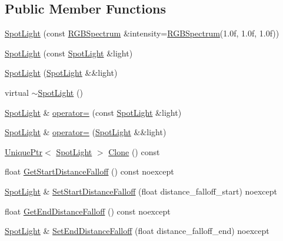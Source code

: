 \subsection*{Public Member Functions}
\begin{DoxyCompactItemize}
\item 
\hyperlink{classmage_1_1_spot_light_adc5c7b5fead1b7b0c8728ffd816a9ada}{Spot\+Light} (const \hyperlink{structmage_1_1_r_g_b_spectrum}{R\+G\+B\+Spectrum} \&intensity=\hyperlink{structmage_1_1_r_g_b_spectrum}{R\+G\+B\+Spectrum}(1.\+0f, 1.\+0f, 1.\+0f))
\item 
\hyperlink{classmage_1_1_spot_light_a597abd916ed14372be208a68eb01b871}{Spot\+Light} (const \hyperlink{classmage_1_1_spot_light}{Spot\+Light} \&light)
\item 
\hyperlink{classmage_1_1_spot_light_a3a5574f34f5b80cbeef00709f8a9d094}{Spot\+Light} (\hyperlink{classmage_1_1_spot_light}{Spot\+Light} \&\&light)
\item 
virtual \hyperlink{classmage_1_1_spot_light_aeeaba91c6448102ac6a23587c5366808}{$\sim$\+Spot\+Light} ()
\item 
\hyperlink{classmage_1_1_spot_light}{Spot\+Light} \& \hyperlink{classmage_1_1_spot_light_a04a23d643186a58fb3a03d0a73a63e39}{operator=} (const \hyperlink{classmage_1_1_spot_light}{Spot\+Light} \&light)
\item 
\hyperlink{classmage_1_1_spot_light}{Spot\+Light} \& \hyperlink{classmage_1_1_spot_light_ab79e4bf1c488c1a753f434a4d84567e5}{operator=} (\hyperlink{classmage_1_1_spot_light}{Spot\+Light} \&\&light)
\item 
\hyperlink{namespacemage_a8c307fbcc33bce9b7f2aa4c26c3b95cf}{Unique\+Ptr}$<$ \hyperlink{classmage_1_1_spot_light}{Spot\+Light} $>$ \hyperlink{classmage_1_1_spot_light_a1092a1238be8cfd771a43e6976d16270}{Clone} () const
\item 
float \hyperlink{classmage_1_1_spot_light_a98a5da32f0023d8f0d600fe3f362decd}{Get\+Start\+Distance\+Falloff} () const noexcept
\item 
\hyperlink{classmage_1_1_spot_light}{Spot\+Light} \& \hyperlink{classmage_1_1_spot_light_ab9a64591f25e408f5928a25ebbce7e69}{Set\+Start\+Distance\+Falloff} (float distance\+\_\+falloff\+\_\+start) noexcept
\item 
float \hyperlink{classmage_1_1_spot_light_a4d1d2c3a5f5b2a01e6e625d84eb588d1}{Get\+End\+Distance\+Falloff} () const noexcept
\item 
\hyperlink{classmage_1_1_spot_light}{Spot\+Light} \& \hyperlink{classmage_1_1_spot_light_ab3bc85b2093e6ae8b5a1bec825b97f1c}{Set\+End\+Distance\+Falloff} (float distance\+\_\+falloff\+\_\+end) noexcept

\end{DoxyCompactItemize}
